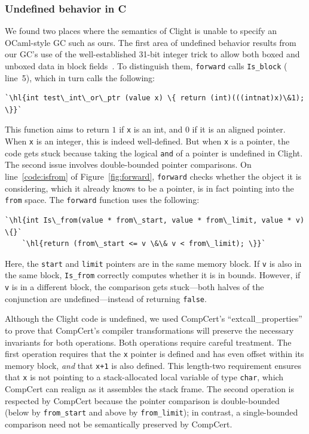 \documentclass[acmsmall,screen]{acmart}
\newcommand{\li}[1]{{\texttt{\small #1}}}
\newcommand{\hl}[1]{\colorbox{lightgray}{#1}}
\begin{document}
\subsubsection*{Undefined behavior in C} We found two places where the semantics of Clight is unable to specify an OCaml-style GC such as ours.
The first area of undefined behavior results from our GC's use of the well-established
31-bit integer trick to allow both boxed and unboxed data in block fields~\cite{realworldocaml}.
To distinguish them, \li{forward} calls \li{Is\_block} ({\color{black} line~5}), which
in turn calls the following:
\begin{lstlisting}[numbers=none]
  `\hl{int test\_int\_or\_ptr (value x) \{ return (int)(((intnat)x)\&1); \}}`
\end{lstlisting}
This function aims to return $1$ if \li{x} is an int, and $0$ if it is an aligned pointer.
When \li{x} is an integer, this is indeed well-defined. 
But when \li{x} is a pointer, the code gets stuck because
taking the logical \li{and} of a pointer is undefined in Clight.
The second issue involves double-bounded pointer comparisons.
On line~\ref{code:isfrom} of Figure~\ref{fig:forward}, \li{forward} checks 
whether the object it is considering, which it already knows to be a pointer,
is in fact pointing into the \li{from} space.  The \li{forward} function uses the following:
\begin{lstlisting}[numbers=none]
  `\hl{int Is\_from(value * from\_start, value * from\_limit, value * v) \{}`
    `\hl{return (from\_start <= v \&\& v < from\_limit); \}}`
\end{lstlisting}
Here, the \li{start} and \li{limit} pointers are in the same
memory block. If \li{v} is also in the same block, \li{Is{\_}from}
correctly computes whether it is in bounds.
However, if \li{v} is in a different block, the comparison gets stuck---both halves 
of the conjunction are undefined---instead of
returning \li{false}.

Although the Clight code is undefined, we used CompCert's ``extcall{\_}properties''
to prove that CompCert's compiler transformations will preserve the necessary invariants
for both operations. Both operations require careful treatment.  The first operation 
requires that the \li{x} pointer is defined and has even offset within its memory block, 
\emph{and} that \li{x+1} is also defined.  This length-two requirement ensures that
\li{x} is not pointing to a stack-allocated local variable of type \li{char},
which CompCert can realign as it assembles the stack frame.  The second operation
is respected by CompCert because the pointer comparison is double-bounded (below by 
\li{from\_start} and above by \li{from\_limit}); in contrast, a single-bounded 
comparison need not be semantically preserved by CompCert.
\end{document}
